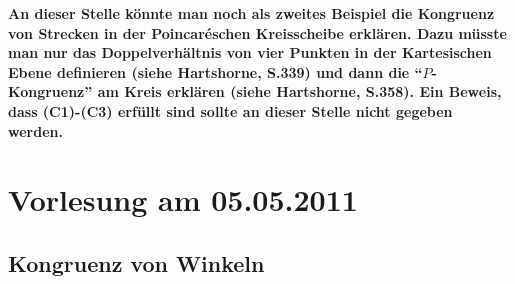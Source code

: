 {\bf An dieser Stelle könnte man noch als zweites Beispiel die
  Kongruenz von Strecken in der Poincar\'eschen Kreisscheibe erklären.
Dazu müsste man nur das Doppelverhältnis von vier Punkten in der
Kartesischen Ebene definieren (siehe Hartshorne, S.339) und dann die
``$P$-Kongruenz'' am Kreis erklären (siehe Hartshorne, S.358). Ein Beweis,
dass (C1)-(C3) erfüllt sind sollte an dieser Stelle nicht gegeben werden.}





\section*{Vorlesung am 05.05.2011}


\subsection*{Kongruenz von Winkeln}


